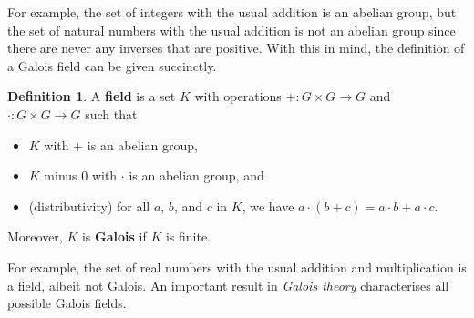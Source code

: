 \documentclass{article}
\theoremstyle{definition}
\newtheorem{definition}{Definition}
\begin{document}
For example, the set of integers with the usual addition is an abelian group, but the set of natural numbers with the usual addition is not an abelian group since there are never any inverses that are positive. With this in mind, the definition of a Galois field can be given succinctly.

\begin{definition}
A \textbf{field} is a set $ K $ with operations $ + : G \times G \to G $ and $ \cdot : G \times G \to G $ such that
\begin{itemize}
\item $ K $ with $ + $ is an abelian group,
\item $ K $ minus $ 0 $ with $ \cdot $ is an abelian group, and
\item (distributivity) for all $ a $, $ b $, and $ c $ in $ K $, we have $ a \cdot (b + c) = a \cdot b + a \cdot c $.
\end{itemize}
Moreover, $ K $ is \textbf{Galois} if $ K $ is finite.
\end{definition}

For example, the set of real numbers with the usual addition and multiplication is a field, albeit not Galois. An important result in \emph{Galois theory} characterises all possible Galois fields.
\end{document}
